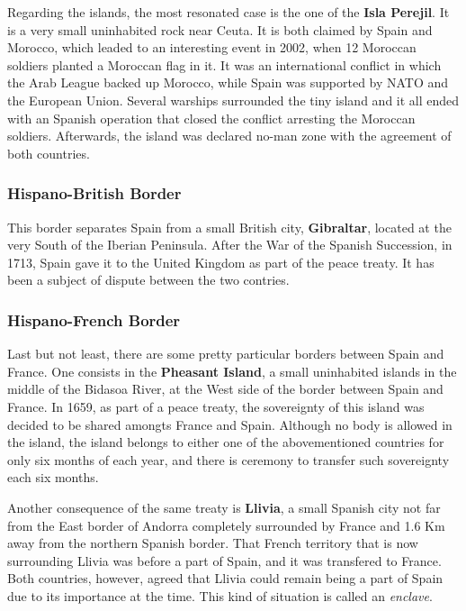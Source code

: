\documentclass[../my_knowledge.tex]{subfiles}
\begin{document}
Regarding the islands, the most resonated case is the one of the \textbf{Isla Perejil}. It is a very small uninhabited rock near Ceuta. It is both claimed by Spain and Morocco, which leaded to an interesting event in 2002, when 12 Moroccan soldiers planted a Moroccan flag in it. It was an international conflict in which the Arab League backed up Morocco, while Spain was supported by NATO and the European Union. Several warships surrounded the tiny island and it all ended with an Spanish operation that closed the conflict arresting the Moroccan soldiers. Afterwards, the island was declared no-man zone with the agreement of both countries.

\subsubsection{Hispano-British Border}
This border separates Spain from a small British city, \textbf{Gibraltar}, located at the very South of the Iberian Peninsula. After the War of the Spanish Succession, in 1713, Spain gave it to the United Kingdom as part of the peace treaty. It has been a subject of dispute between the two contries.

\subsubsection{Hispano-French Border}
Last but not least, there are some pretty particular borders between Spain and France. One consists in the \textbf{Pheasant Island}, a small uninhabited islands in the middle of the Bidasoa River, at the West side of the border between Spain and France. In 1659, as part of a peace treaty, the sovereignty of this island was decided to be shared amongts France and Spain. Although no body is allowed in the island, the island belongs to either one of the abovementioned countries for only six months of each year, and there is ceremony to transfer such sovereignty each six months.

Another consequence of the same treaty is \textbf{Llivia}, a small Spanish city not far from the East border of Andorra completely surrounded by France and 1.6 Km away from the northern Spanish border. That French territory that is now surrounding Llivia was before a part of Spain, and it was transfered to France. Both countries, however, agreed that Llivia could remain being a part of Spain due to its importance at the time. This kind of situation is called an \textit{enclave}.
\end{document}
